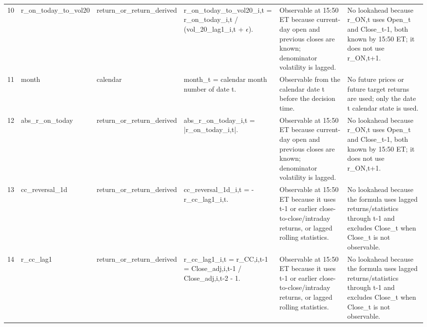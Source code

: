 \begin{landscape}
\begin{longtable}{P{0.42cm} P{2.25cm} P{2.05cm} P{5.25cm} P{4.85cm} P{5.25cm}}
10 & r\_\allowbreak{}on\_\allowbreak{}today\_\allowbreak{}to\_\allowbreak{}vol20 & return\_\allowbreak{}or\_\allowbreak{}return\_\allowbreak{}derived & r\_\allowbreak{}on\_\allowbreak{}today\_\allowbreak{}to\_\allowbreak{}vol20\_\allowbreak{}i,t = r\_\allowbreak{}on\_\allowbreak{}today\_\allowbreak{}i,t / (vol\_\allowbreak{}20\_\allowbreak{}lag1\_\allowbreak{}i,t + $\epsilon$). & Observable at 15:50 ET because current-day open and previous closes are known; denominator volatility is lagged. & No lookahead because r\_\allowbreak{}ON,t uses Open\_\allowbreak{}t and Close\_\allowbreak{}t-1, both known by 15:50 ET; it does not use r\_\allowbreak{}ON,t+1. \\
11 & month & calendar & month\_\allowbreak{}t = calendar month number of date t. & Observable from the calendar date t before the decision time. & No future prices or future target returns are used; only the date t calendar state is used. \\
12 & abs\_\allowbreak{}r\_\allowbreak{}on\_\allowbreak{}today & return\_\allowbreak{}or\_\allowbreak{}return\_\allowbreak{}derived & abs\_\allowbreak{}r\_\allowbreak{}on\_\allowbreak{}today\_\allowbreak{}i,t = |r\_\allowbreak{}on\_\allowbreak{}today\_\allowbreak{}i,t|. & Observable at 15:50 ET because current-day open and previous closes are known; denominator volatility is lagged. & No lookahead because r\_\allowbreak{}ON,t uses Open\_\allowbreak{}t and Close\_\allowbreak{}t-1, both known by 15:50 ET; it does not use r\_\allowbreak{}ON,t+1. \\
13 & cc\_\allowbreak{}reversal\_\allowbreak{}1d & return\_\allowbreak{}or\_\allowbreak{}return\_\allowbreak{}derived & cc\_\allowbreak{}reversal\_\allowbreak{}1d\_\allowbreak{}i,t = - r\_\allowbreak{}cc\_\allowbreak{}lag1\_\allowbreak{}i,t. & Observable at 15:50 ET because it uses t-1 or earlier close-to-close/intraday returns, or lagged rolling statistics. & No lookahead because the formula uses lagged returns/statistics through t-1 and excludes Close\_\allowbreak{}t when Close\_\allowbreak{}t is not observable. \\
14 & r\_\allowbreak{}cc\_\allowbreak{}lag1 & return\_\allowbreak{}or\_\allowbreak{}return\_\allowbreak{}derived & r\_\allowbreak{}cc\_\allowbreak{}lag1\_\allowbreak{}i,t = r\_\allowbreak{}CC,i,t-1 = Close\_\allowbreak{}adj,i,t-1 / Close\_\allowbreak{}adj,i,t-2 - 1. & Observable at 15:50 ET because it uses t-1 or earlier close-to-close/intraday returns, or lagged rolling statistics. & No lookahead because the formula uses lagged returns/statistics through t-1 and excludes Close\_\allowbreak{}t when Close\_\allowbreak{}t is not observable. \\

\end{longtable}
\end{landscape}
